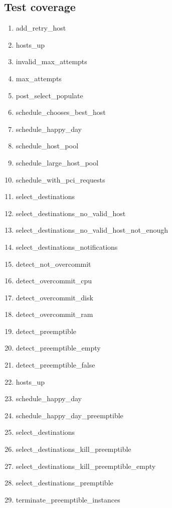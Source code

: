 \documentclass[a4wide,11pt]{article}
\begin{document}
\subsection{Test coverage}
\begin{enumerate}
        \item add\_retry\_host
        \item hosts\_up
        \item invalid\_max\_attempts
        \item max\_attempts
        \item post\_select\_populate
        \item schedule\_chooses\_best\_host
        \item schedule\_happy\_day
        \item schedule\_host\_pool
        \item schedule\_large\_host\_pool
        \item schedule\_with\_pci\_requests
        \item select\_destinations
        \item select\_destinations\_no\_valid\_host
        \item select\_destinations\_no\_valid\_host\_not\_enough
        \item select\_destinations\_notifications
        \item detect\_not\_overcommit
        \item detect\_overcommit\_cpu
        \item detect\_overcommit\_disk
        \item detect\_overcommit\_ram
        \item detect\_preemptible
        \item detect\_preemptible\_empty
        \item detect\_preemptible\_false
        \item hosts\_up
        \item schedule\_happy\_day
        \item schedule\_happy\_day\_preemptible
        \item select\_destinations
        \item select\_destinations\_kill\_preemptible
        \item select\_destinations\_kill\_preemptible\_empty
        \item select\_destinations\_premptible
        \item terminate\_preemptible\_instances
    \end{enumerate}
\end{document}
